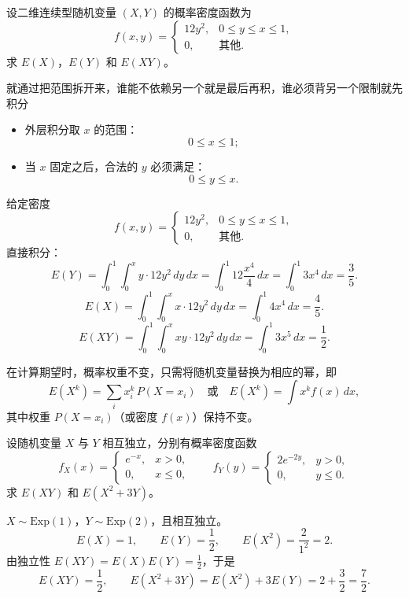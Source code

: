 \begin{homework}[3.20]
设二维连续型随机变量 $(X,Y)$ 的概率密度函数为
\[
f(x,y)=
\begin{cases}
12y^2, & 0 \le y \le x \le 1,\\[4pt]
0, & \text{其他}.
\end{cases}
\]
求 $E(X)$，$E(Y)$ 和 $E(XY)$。
\end{homework}
\begin{dxtips}[如何分辨先积谁后积谁]
就通过把范围拆开来，谁能不依赖另一个就是最后再积，谁必须背另一个限制就先积分
    \begin{itemize}
  \item 外层积分取 $x$ 的范围：
  \[
    0 \le x \le 1;
  \]
  \item 当 $x$ 固定之后，合法的 $y$ 必须满足：
  \[
    0 \le y \le x.
  \]
\end{itemize}
\end{dxtips}
\begin{solution}[作业 3.20]
给定密度
\[
f(x,y)=\begin{cases}
12y^2,& 0\le y\le x\le 1,\\
0,& \text{其他}.
\end{cases}
\]
直接积分：
\[
E(Y)=\int_{0}^{1}\!\!\int_{0}^{x} y\cdot12y^2\,dy\,dx
= \int_{0}^{1} 12\frac{x^4}{4}\,dx=\int_{0}^{1}3x^4\,dx=\frac{3}{5}.
\]
\[
E(X)=\int_{0}^{1}\!\!\int_{0}^{x} x\cdot12y^2\,dy\,dx
= \int_{0}^{1} 4x^4\,dx=\frac{4}{5}.
\]
\[
E(XY)=\int_{0}^{1}\!\!\int_{0}^{x} xy\cdot12y^2\,dy\,dx
= \int_{0}^{1} 3x^5\,dx=\frac{1}{2}.
\]
\end{solution}
\begin{dxtips}
    在计算期望时，概率权重不变，只需将随机变量替换为相应的幂，即
\[
E(X^k)=\sum_i x_i^k\,P(X=x_i)
\quad\text{或}\quad
E(X^k)=\int x^k f(x)\,dx,
\]
其中权重 \(P(X=x_i)\)（或密度 \(f(x)\)）保持不变。
\end{dxtips}
\begin{homework}[3.21]
设随机变量 $X$ 与 $Y$ 相互独立，分别有概率密度函数
\[
f_X(x)=
\begin{cases}
e^{-x}, & x>0,\\
0, & x\le0,
\end{cases}
\qquad
f_Y(y)=
\begin{cases}
2e^{-2y}, & y>0,\\
0, & y\le0.
\end{cases}
\]
求 $E(XY)$ 和 $E(X^2+3Y)$。
\end{homework}



\begin{solution}[作业 3.21]
$X\sim \mathrm{Exp}(1)$，$Y\sim \mathrm{Exp}(2)$，且相互独立。
\[
E(X)=1,\qquad E(Y)=\frac{1}{2},\qquad E(X^2)=\frac{2}{1^2}=2.
\]
由独立性 $E(XY)=E(X)E(Y)=\frac{1}{2}$，于是
\[
E(XY)=\frac{1}{2},\qquad E(X^2+3Y)=E(X^2)+3E(Y)=2+\frac{3}{2}=\frac{7}{2}.
\]
\end{solution}
